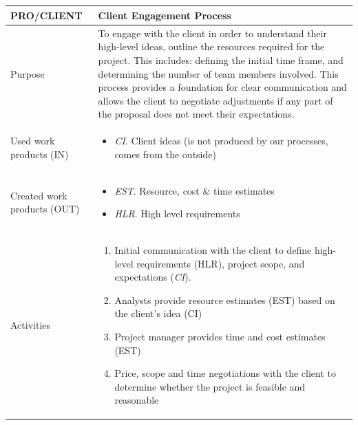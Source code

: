 \subsection{}
\begin{table}[h!]
\begin{tabular}{l|p{}}
\hline
\textbf{PRO/CLIENT}        & \textbf{Client Engagement Process} \\ \hline
Purpose &  To engage with the client in order to understand their high-level ideas, outline the resources required for the project. This includes: defining the initial time frame, and determining the number of team members involved. This process provides a foundation for clear communication and allows the client to negotiate adjustments if any part of the proposal does not meet their expectations.  \\ \hline
Used work products (IN)   &      
\begin{itemize}
    \item \textit{CI}. Client ideas (is not produced by our processes, comes from the outside)
\end{itemize}
\\ \hline
Created work products (OUT) &     
\begin{itemize}
    \item \textit{EST}. Resource, cost \& time estimates
    \item \textit{HLR}. High level requirements 
\end{itemize}
\\ \hline
Activities            &   
\begin{enumerate}
    \item Initial communication with the client to define high-level requirements (HLR), project scope, and expectations (\textit{CI}).
    \item Analysts provide resource estimates (EST) based on the client's idea (CI)
    \item Project manager provides time and cost estimates (EST)
    \item Price, scope and time negotiations with the client to determine whether the project is feasible and reasonable
     
\end{enumerate}
\\ \hline

\end{tabular}

\label{pro/sign}
\end{table}

